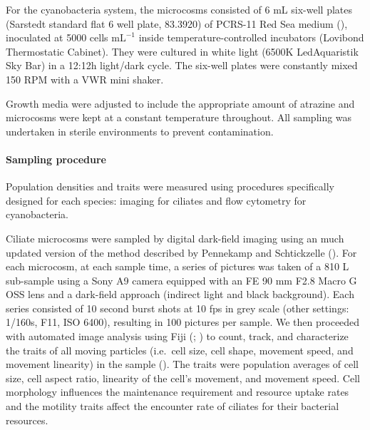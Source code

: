 \documentclass[
  letterpaper,
  DIV=11,
  numbers=noendperiod]{scrartcl}
\let\oldparagraph\paragraph
\renewcommand{\paragraph}[1]{\oldparagraph{#1}\mbox{}}
\begin{document}
For the cyanobacteria system, the microcosms consisted of 6 mL six-well
plates (Sarstedt standard flat 6 well plate, 83.3920) of PCRS-11 Red Sea
medium (), inoculated at
5000 cells \(\mathrm{mL}^{-1}\) inside temperature-controlled incubators
(Lovibond Thermostatic Cabinet). They were cultured in white light
(6500K LedAquaristik Sky Bar) in a 12:12h light/dark cycle. The six-well
plates were constantly mixed 150 RPM with a VWR mini shaker.

Growth media were adjusted to include the appropriate amount of atrazine
and microcosms were kept at a constant temperature throughout. All
sampling was undertaken in sterile environments to prevent
contamination.

\paragraph{Sampling procedure}\label{sampling-procedure}

Population densities and traits were measured using procedures
specifically designed for each species: imaging for ciliates and flow
cytometry for cyanobacteria.

Ciliate microcosms were sampled by digital dark-field imaging using an
much updated version of the method described by Pennekamp and
Schtickzelle (). For each microcosm,
at each sample time, a series of pictures was taken of a 810 \textmu L
sub-sample using a Sony A9 camera equipped with an FE 90 mm F2.8 Macro G
OSS lens and a dark-field approach (indirect light and black
background). Each series consisted of 10 second burst shots at 10 fps in
grey scale (other settings: 1/160s, F11, ISO 6400), resulting in 100
pictures per sample. We then proceeded with automated image analysis
using Fiji (;
) to count, track, and
characterize the traits of all moving particles (i.e.~cell size, cell
shape, movement speed, and movement linearity) in the sample
(). The traits were
population averages of cell size, cell aspect ratio, linearity of the
cell's movement, and movement speed. Cell morphology influences the
maintenance requirement and resource uptake rates and the motility
traits affect the encounter rate of ciliates for their bacterial
resources.
\end{document}
